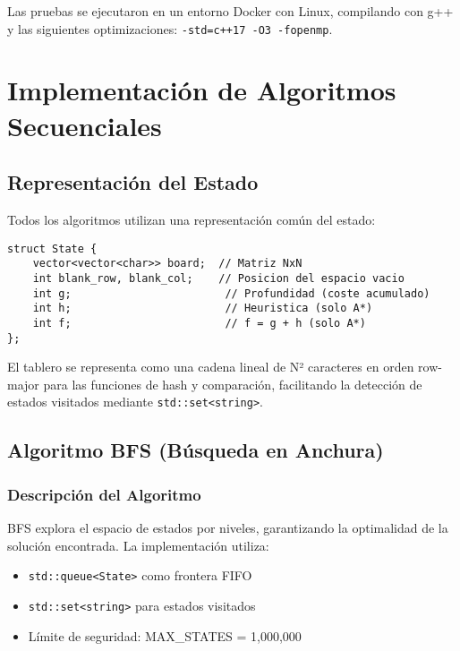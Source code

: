 \documentclass[12pt,a4paper]{article}
\begin{document}
Las pruebas se ejecutaron en un entorno Docker con Linux, compilando con g++ y las siguientes optimizaciones: \texttt{-std=c++17 -O3 -fopenmp}.

\section{Implementación de Algoritmos Secuenciales}

\subsection{Representación del Estado}

Todos los algoritmos utilizan una representación común del estado:

\begin{lstlisting}
struct State {
    vector<vector<char>> board;  // Matriz NxN
    int blank_row, blank_col;    // Posicion del espacio vacio
    int g;                        // Profundidad (coste acumulado)
    int h;                        // Heuristica (solo A*)
    int f;                        // f = g + h (solo A*)
};
\end{lstlisting}

El tablero se representa como una cadena lineal de N² caracteres en orden row-major para las funciones de hash y comparación, facilitando la detección de estados visitados mediante \texttt{std::set<string>}.

\subsection{Algoritmo BFS (Búsqueda en Anchura)}

\subsubsection{Descripción del Algoritmo}

BFS explora el espacio de estados por niveles, garantizando la optimalidad de la solución encontrada. La implementación utiliza:

\begin{itemize}
    \item \texttt{std::queue<State>} como frontera FIFO
    \item \texttt{std::set<string>} para estados visitados
    \item Límite de seguridad: MAX\_STATES = 1,000,000
\end{itemize}
\end{document}
